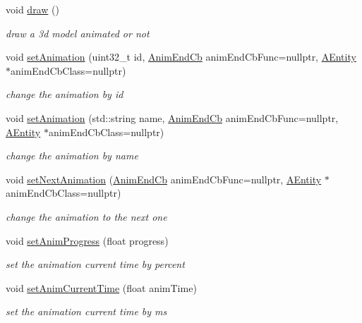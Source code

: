 \begin{DoxyCompactItemize}
\mbox{\label{class_model_ac7b168fc3a84f9ac2b558d1019869ca7}} 
void \hyperlink{class_model_ac7b168fc3a84f9ac2b558d1019869ca7}{draw} ()
\begin{DoxyCompactList}\small\item\em draw a 3d model animated or not \end{DoxyCompactList}\item 
void \hyperlink{class_model_a7a9a9f18809ed6fb7796a16169eb4ef5}{set\+Animation} (uint32\+\_\+t id, \hyperlink{class_model_a10bbf272d503c30923993e5a5ac45bed}{Anim\+End\+Cb} anim\+End\+Cb\+Func=nullptr, \hyperlink{class_a_entity}{A\+Entity} $\ast$anim\+End\+Cb\+Class=nullptr)
\begin{DoxyCompactList}\small\item\em change the animation by id \end{DoxyCompactList}\item 
void \hyperlink{class_model_ab87d20db0409bd958fc5bc9d7d2998bd}{set\+Animation} (std\+::string name, \hyperlink{class_model_a10bbf272d503c30923993e5a5ac45bed}{Anim\+End\+Cb} anim\+End\+Cb\+Func=nullptr, \hyperlink{class_a_entity}{A\+Entity} $\ast$anim\+End\+Cb\+Class=nullptr)
\begin{DoxyCompactList}\small\item\em change the animation by name \end{DoxyCompactList}\item 
void \hyperlink{class_model_a018455b77033e1ff6c4d9a9a9126df1f}{set\+Next\+Animation} (\hyperlink{class_model_a10bbf272d503c30923993e5a5ac45bed}{Anim\+End\+Cb} anim\+End\+Cb\+Func=nullptr, \hyperlink{class_a_entity}{A\+Entity} $\ast$anim\+End\+Cb\+Class=nullptr)
\begin{DoxyCompactList}\small\item\em change the animation to the next one \end{DoxyCompactList}\item 
void \hyperlink{class_model_ad31f04ef7a7f4e8ee91bbfb6def4f579}{set\+Anim\+Progress} (float progress)
\begin{DoxyCompactList}\small\item\em set the animation current time by percent \end{DoxyCompactList}\item 
void \hyperlink{class_model_ae088c69e8bd04e5898b4f0261e555fbc}{set\+Anim\+Current\+Time} (float anim\+Time)
\begin{DoxyCompactList}\small\item\em set the animation current time by ms \end{DoxyCompactList}\item 

\end{DoxyCompactItemize}
